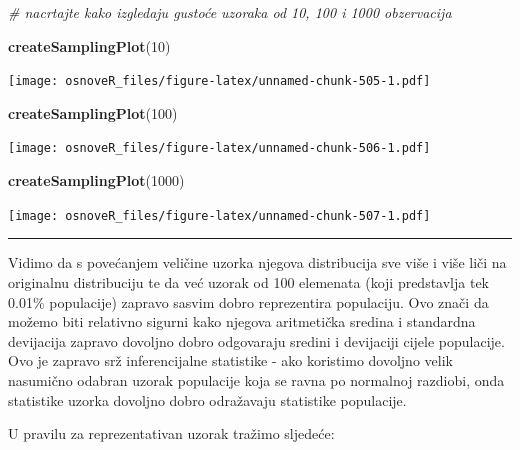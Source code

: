 \documentclass[]{book}
\newenvironment{Shaded}{\begin{snugshade}}{\end{snugshade}}
\newcommand{\KeywordTok}[1]{\textcolor[rgb]{0.13,0.29,0.53}{\textbf{#1}}}
\newcommand{\DecValTok}[1]{\textcolor[rgb]{0.00,0.00,0.81}{#1}}
\newcommand{\CommentTok}[1]{\textcolor[rgb]{0.56,0.35,0.01}{\textit{#1}}}
\newcommand{\NormalTok}[1]{#1}
\theoremstyle{definition}
\theoremstyle{definition}
\theoremstyle{definition}
\theoremstyle{remark}
\begin{document}
\begin{Shaded}
\begin{Highlighting}[]
\CommentTok{# nacrtajte kako izgledaju gustoće uzoraka od 10, 100 i 1000 obzervacija}
\end{Highlighting}
\end{Shaded}

\begin{Shaded}
\begin{Highlighting}[]
\KeywordTok{createSamplingPlot}\NormalTok{(}\DecValTok{10}\NormalTok{)}
\end{Highlighting}
\end{Shaded}

\texttt{[image: osnoveR\_files/figure-latex/unnamed-chunk-505-1.pdf]}

\begin{Shaded}
\begin{Highlighting}[]
\KeywordTok{createSamplingPlot}\NormalTok{(}\DecValTok{100}\NormalTok{)}
\end{Highlighting}
\end{Shaded}

\texttt{[image: osnoveR\_files/figure-latex/unnamed-chunk-506-1.pdf]}

\begin{Shaded}
\begin{Highlighting}[]
\KeywordTok{createSamplingPlot}\NormalTok{(}\DecValTok{1000}\NormalTok{)}
\end{Highlighting}
\end{Shaded}

\texttt{[image: osnoveR\_files/figure-latex/unnamed-chunk-507-1.pdf]}

\begin{center}\rule{0.5\linewidth}{\linethickness}\end{center}

Vidimo da s povećanjem veličine uzorka njegova distribucija sve više i
više liči na originalnu distribuciju te da već uzorak od 100 elemenata
(koji predstavlja tek 0.01\% populacije) zapravo sasvim dobro
reprezentira populaciju. Ovo znači da možemo biti relativno sigurni kako
njegova aritmetička sredina i standardna devijacija zapravo dovoljno
dobro odgovaraju sredini i devijaciji cijele populacije. Ovo je zapravo
srž inferencijalne statistike - ako koristimo dovoljno velik nasumično
odabran uzorak populacije koja se ravna po normalnoj razdiobi, onda
statistike uzorka dovoljno dobro odražavaju statistike populacije.

U pravilu za reprezentativan uzorak tražimo sljedeće:
\end{document}
